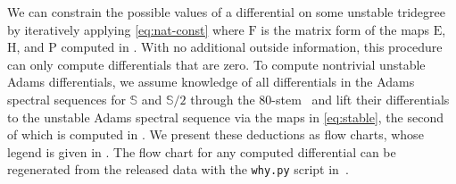 \documentclass[dvipsnames,table]{amsart}
\theoremstyle{definition}
\theoremstyle{remark}
\numberwithin{equation}{section}
\begin{document}
\noindent We can constrain the possible values of a differential on some unstable tridegree by iteratively applying \eqref{eq:nat-const} where $\mathrm{F}$ is the matrix form of the maps $\mathrm{E}$, $\mathrm{H}$, and $\mathrm{P}$ computed in . With no additional outside information, this procedure can only compute differentials that are zero. To compute nontrivial unstable Adams differentials,
we assume knowledge of all differentials in the Adams spectral sequences for $\mathbb{S}$ and $\mathbb{S}/2$ through the 80-stem~\cite{Isaksen_Wang_Xu_2023, Lin_Wang_Xu_2024, Lin_Wang_Xu_2025} and lift their differentials to the unstable Adams spectral sequence via the maps in \eqref{eq:stable}, the second of which is computed in . We present these deductions as flow charts, whose legend is given in . The flow chart for any computed differential can be regenerated from the released data with the \texttt{why.py} script in~\cite{ehpreprint_data}.
\end{document}

